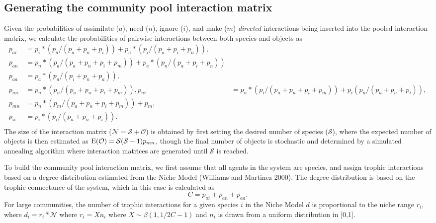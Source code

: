 \documentclass[twocolumn,preprintnumbers,amsmath,amssymb,superscriptaddress]{revtex4}
\begin{document}
\subsection{Generating the community pool interaction matrix}
Given the probabilities of assimilate ($a$), need ($n$), ignore ($i$), and make ($m$) \emph{directed} interactions being inserted into the pooled interaction matrix, we calculate the probabilities of pairwise interactions between both species and objects as 
\begin{align}
  p_{ai} &= p_i*(p_a/(p_a+p_n+p_i)) + p_a*(p_i/(p_a+p_i+p_n)),\\ \nonumber
  p_{an} &= p_n*(p_a/(p_a+p_n+p_i+p_m)) + p_a*(p_n/(p_a+p_i+p_n))\\ \nonumber
  p_{aa} &= p_a*(p_a/(p_i+p_n+p_a)),\\ \nonumber
  p_{nn} &= p_n*(p_n/(p_a+p_n+p_i+p_m)),
  p_{ni} &= p_n*(p_i/(p_a+p_n+p_i+p_m)) + p_i(p_n/(p_a+p_n+p_i)),\\ \nonumber
  p_{mn} &= p_n*(p_m/(p_a+p_n+p_i+p_m)) + p_m,\\ \nonumber
  p_{ii} &= p_i*(p_i/(p_a+p_n+p_i)).\\ \nonumber
\end{align}
The size of the interaction matrix ($\mathcal{N} = \mathcal{S} + \mathcal{O}$) is obtained by first setting the desired number of species ($\mathcal{S}$), where the expected number of objects is then estimated as ${\rm E}(\mathcal{O}) = \mathcal{S}(\mathcal{S}-1)p_{mn}$, though the final number of objects is stochastic and determined by a simulated annealing algorithm where interaction matrices are generated until $\mathcal{S}$ is reached.

To build the community pool interaction matrix, we first assume that all agents in the system are species, and assign trophic interactions based on a degree distribution estimated from the Niche Model (Williams and Martinez 2000).
The degree distribution is based on the trophic connectance of the system, which in this case is calculated as 
\begin{equation}
  C = p_{ai}+p_{an}+p_{aa}.
\end{equation}
For large communities, the number of trophic interactions for a given species $i$ in the Niche Model $d$ is proportional to the niche range $r_i$, where $d_i = r_i*\mathcal{N}$ where $r_i = Xn_i$ where $X \sim \beta(1,1/2C - 1)$ and $n_i$ is drawn from a uniform distribution in [0,1].
\end{document}
